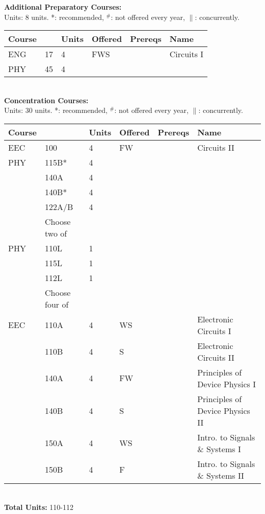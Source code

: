\documentclass[12pt]{article}
\begin{document}
\newpage
{}
\vskip 0.25cm
\noindent
{\bf Additional Preparatory Courses:  }\\
Units:  8 units. *: recommended, $^\#$: not offered every year, $\parallel$: concurrently.\\
\begin{tabular}{|llllll|}
\hline
Course & & Units & Offered & Prereqs & Name \\
\hline
ENG & 17     & 4 & FWS & & Circuits I\\
PHY & 45     & 4 & & & \\
\hline
\end{tabular}\\
\vskip 0.25cm
\noindent
{\bf Concentration Courses:  }\\
Units:  30 units. *: recommended, $^\#$: not offered every year, $\parallel$: concurrently.\\
\begin{tabular}{|llllll|}
\hline
Course & & Units & Offered & Prereqs & Name \\
\hline
EEC & 100    & 4 & FW & & Circuits II\\
PHY & 115B*  & 4 & & & \\
    & 140A   & 4 & & & \\
    & 140B*  & 4 & & & \\
    & 122A/B & 4 & & & \\
\hline
\hline
    & Choose two of & & & & \\
\hline
PHY & 110L & 1 & & & \\
    & 115L & 1 & & & \\
    & 112L & 1 & & & \\
\hline
\hline
    & Choose four of & & & & \\
\hline
EEC & 110A  & 4 & WS & & Electronic Circuits I \\
    & 110B  & 4 & S  & & Electronic Circuits II\\
    & 140A  & 4 & FW & & Principles of Device Physics I\\
    & 140B  & 4 & S  & & Principles of Device Physics II\\
    & 150A  & 4 & WS & & Intro. to Signals \& Systems I\\
    & 150B  & 4 & F  & & Intro. to Signals \& Systems II\\
\hline
\end{tabular}\\
\vskip 0.25cm
\noindent
{\bf Total Units:} 110-112\\
\end{document}
